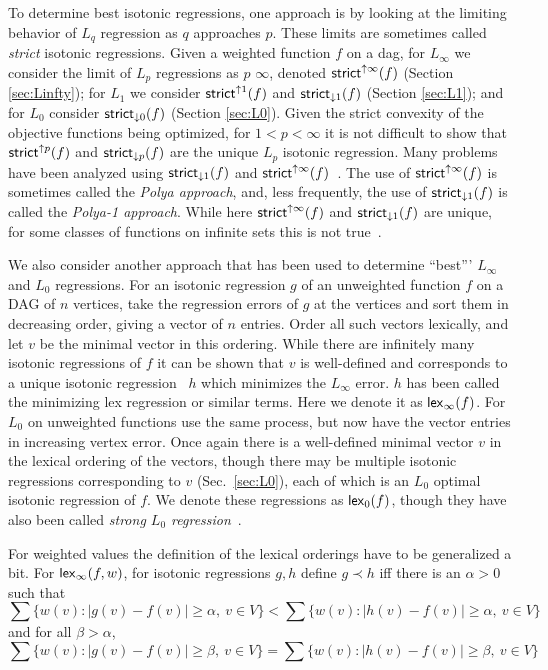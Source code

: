 \documentclass[11pt]{article}
\newcommand{\Strictdown}[2]{\ensuremath{\mathsf{strict}_{\downarrow{#1}}\ifthenelse{\equal{#2}{}}{}{(#2)}}}
\newcommand{\Strictup}[2]{\ensuremath{\mathsf{strict}^{\uparrow {#1}}\ifthenelse{\equal{#2}{}}{}{(#2)}}}
\newcommand{\lex}[2]{\ensuremath{\mathsf{lex}_{#1} \ifthenelse{\equal{#2}{}}{}{(#2)}}}
\begin{document}
To determine best isotonic regressions, one approach is by looking at the limiting behavior of $L_q$ regression as $q$ approaches $p$.
These limits are sometimes called \textit{strict} isotonic regressions.
Given a weighted function $f$ on a dag, for $L_\infty$ we consider the limit of $L_p$ regressions as 
$p$ \scalebox{0.8}{$\nearrow$} $\infty$, denoted \Strictup{\infty}{f} (Section \ref{sec:Linfty}); 
for $L_1$ we consider \Strictup{1}{f} and \Strictdown{1}{f} (Section \ref{sec:L1}); and
for $L_0$ consider \Strictdown{0}{f} (Section \ref{sec:L0}).
Given the strict convexity of the objective functions being optimized,  for  $1 < p <\infty$ it is not difficult to show that \Strictup{p}{f} and \Strictdown{p}{f} are the unique $L_p$ isotonic regression.
Many problems have been analyzed using \Strictdown{1}{f} and  \Strictup{\infty}{f}~\cite{DLG_LinfPolya83,EggerTaylorPolya1ConvRate93,HLMT_L1Polya88,QFOMMB_PolyaL1}.
The use of \Strictup{\infty}{f} is sometimes called the \textit{Polya approach}, and, less frequently, the use of
\Strictdown{1}{f} is called the \textit{Polya-1 approach}.
While here \Strictup{\infty}{f} and \Strictdown{1}{f} are unique, for some classes of functions on infinite sets this is not true~\cite{BadL1}.

We also consider another approach that has been used to determine ``best''' $L_\infty$ and $L_0$ regressions.
For an isotonic regression $g$ of an unweighted function $f$ on a DAG of $n$ vertices, take the regression errors of $g$ at the vertices and sort them in decreasing order, giving a vector of $n$ entries.
Order all such vectors lexically, and let $v$ be the minimal vector in this ordering.
While there are infinitely many isotonic regressions of $f$ it can be shown that $v$ is well-defined and
corresponds to a unique isotonic regression~\cite{QStrictLinfty} $h$ which minimizes the $L_\infty$ error.
$h$ has been called the minimizing lex regression or similar terms.
Here we denote it as \lex{\infty}{f}.
For $L_0$ on unweighted functions use the same process, but now have the vector entries in increasing vertex error.
Once again there is a well-defined minimal vector $v$ in the lexical ordering of the vectors, though
there may be multiple isotonic regressions corresponding to $v$ (Sec.\ \ref{sec:L0}), each of which is an $L_0$ optimal isotonic regression of $f$.
We denote these regressions as \lex{0}{f}, though they have also been called \textit{strong $L_0$ regression}~\cite{QL0Secondary}.

For weighted values the definition of the lexical orderings have to be generalized a bit.
For \lex{\infty}{f,w}, for isotonic regressions $g, h$ define $g \prec h$ iff there is an $\alpha > 0$ such that
$$\sum \{w(v): |g(v)\!-\!f(v)| \geq \alpha,~ v \in V\}  < \sum \{w(v): |h(v)\!-\!f(v)| \geq \alpha,~ v \in V\}$$
and for all $\beta > \alpha$,
$$\sum \{w(v): |g(v)\!-\!f(v)| \geq \beta,~ v \in V\}  = \sum \{w(v): |h(v)\!-\!f(v)| \geq \beta, ~v \in V\}$$
\end{document}
